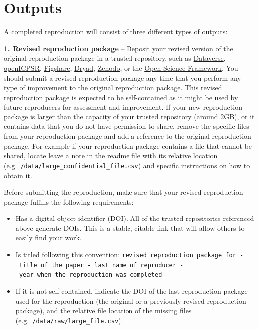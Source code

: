 \documentclass[
]{book}
\providecommand{\tightlist}{%
  \setlength{\itemsep}{0pt}\setlength{\parskip}{0pt}}
\begin{document}
\hypertarget{outputs}{%
\section{Outputs}\label{outputs}}

A completed reproduction will consist of three different types of outputs:

\textbf{1. Revised reproduction package} -- Deposit your revised version of the original reproduction package in a trusted repository, such as \href{https://dataverse.org/}{Dataverse}, \href{https://www.openicpsr.org/openicpsr/}{openICPSR}, \href{https://figshare.com}{Figshare}, \href{https://datadryad.org/stash}{Dryad}, \href{https://about.zenodo.org/}{Zenodo}, or the \href{osf.io/}{Open Science Framework}. You should submit a revised reproduction package any time that you perform any type of \protect\hyperlink{improvements}{improvement} to the original reproduction package. This revised reproduction package is expected to be self-contained as it might be used by future reproducers for assessment and improvement. If your new reproduction package is larger than the capacity of your trusted repository (around 2GB), or it contains data that you do not have permission to share, remove the specific files from your reproduction package and add a reference to the original reproduction package. For example if your reproduction package contains a file that cannot be shared, locate leave a note in the readme file with its relative location (e.g.~\texttt{/data/large\_confidential\_file.csv}) and specific instructions on how to obtain it.

Before submitting the reproduction, make sure that your revised reproduction package fulfills the following requirements:

\begin{itemize}
\tightlist
\item
  Has a digital object identifier (DOI). All of the trusted repositories referenced above generate DOIs. This is a stable, citable link that will allow others to easily find your work.
\item
  Is titled following this convention: \texttt{revised\ reproduction\ package\ for\ -\ title\ of\ the\ paper\ -\ last\ name\ of\ reproducer\ -\ year\ when\ the\ reproduction\ was\ completed}
\item
  If it is not self-contained, indicate the DOI of the last reproduction package used for the reproduction (the original or a previously revised reproduction package), and the relative file location of the missing files (e.g.~\texttt{/data/raw/large\_file.csv}).
\end{itemize}
\end{document}
